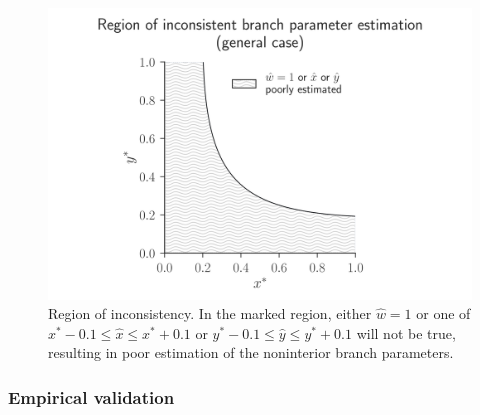 \documentclass{article}
\begin{document}
\begin{figure}
\centering
\includegraphics[width=\textwidth]{bl-loose-inconsistency-inkscape}
\caption{
    Region of inconsistency.
    In the marked region, either $\hat{w}=1$ or one of $x^*-0.1 \le \hat{x} \le x^*+0.1$ or $y^*-0.1 \le \hat{y} \le y^*+0.1$ will not be true, resulting in poor estimation of the noninterior branch parameters.
}
\label{fig:bl-loose-inconsistency}
\end{figure}

\subsubsection*{Empirical validation}
\end{document}
